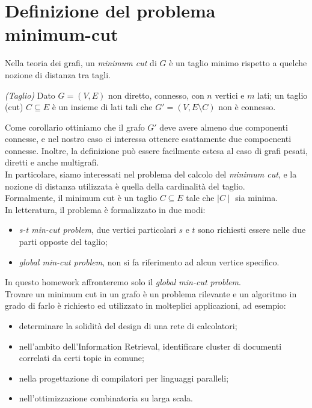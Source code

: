 \section{Definizione del problema minimum-cut}
\label{cap:problem-definition}

Nella teoria dei grafi, un \emph{minimum cut} di $G$ è un taglio
minimo rispetto a quelche nozione di distanza tra tagli.

\begin{defn}{\emph{(Taglio)}}
  Dato $G = (V,E)$ non diretto, connesso, con $n$ vertici e $m$ lati;
  un taglio (cut) $C \subseteq E$ è un insieme di lati tali che $G' =
  (V, E \setminus C)$ non è connesso.
\end{defn}

\noindent Come corollario ottiniamo che il grafo $G'$ deve avere
almeno due componenti connesse, e nel nostro caso ci interessa
ottenere esattamente due compoenenti connesse. Inoltre, la definizione
può essere facilmente estesa al caso di grafi pesati, diretti e anche
multigrafi.\\

\noindent In particolare, siamo interessati nel problema del calcolo
del \textit{minimum cut}, e la nozione di distanza utilizzata è quella
della cardinalità del taglio. \\
Formalmente, il minimum cut è un taglio $C \subseteq E$ tale che $\mid
C \mid$ sia minima.\\

\noindent In letteratura, il problema è formalizzato in due modi:

\begin{itemize}
    \item \textit{s-t min-cut problem}, due vertici particolari $s$ e
      $t$ sono richiesti essere nelle due parti opposte del taglio;
    \item \textit{global min-cut problem}, non si fa riferimento ad
      alcun vertice specifico.
\end{itemize}

\noindent In questo homework affronteremo solo il \textit{global
  min-cut problem}. \\

\noindent Trovare un minimum cut in un grafo è un problema rilevante e
un algoritmo in grado di farlo è richiesto ed utilizzato in molteplici
applicazioni, ad esempio:

\begin{itemize}
    \item determinare la solidità del design di una rete di
      calcolatori;
    \item nell'ambito dell'Information Retrieval, identificare cluster
      di documenti correlati da certi topic in comune;
    \item nella progettazione di compilatori per linguaggi paralleli;
    \item nell'ottimizzazione combinatoria su larga scala.
\end{itemize}
